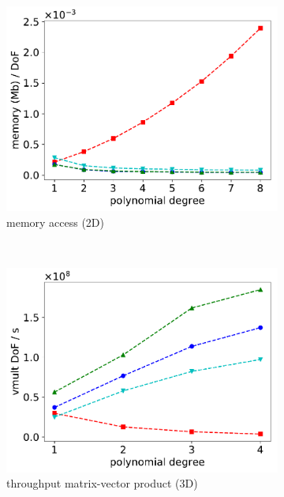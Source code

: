 \documentclass[AMA,STIX1COL]{WileyNJD-v2}
\begin{document}
\begin{figure}
\begin{subfigure}[b]{0.32\textwidth}
      \centering
      \includegraphics[width=\textwidth]{IWR_newest_patched_memory2d.pdf}
      \caption{memory access (2D)}
      \label{fig:benchmark_miehe_IWR_memory2}
  \end{subfigure}
  ~
  \begin{subfigure}[b]{0.32\textwidth}
    \centering
    \includegraphics[width=\textwidth]{IWR_newest_patched_throughput3d.pdf}
    \caption{throughput matrix-vector product (3D)}
  \end{subfigure}
  \begin{subfigure}[b]{0.32\textwidth}
    \centering

\end{subfigure}
\end{figure}
\end{document}
